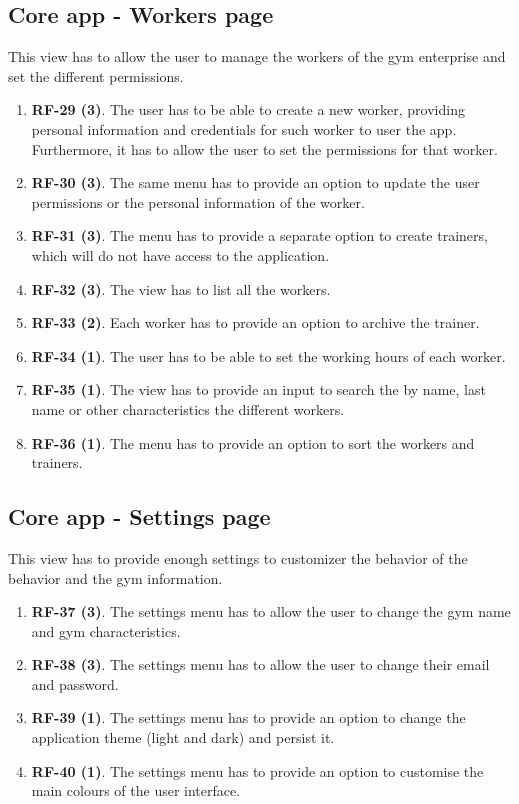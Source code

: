 \documentclass[a4paper, 12pt, oneside]{book}
\begin{document}
\subsection{Core app - Workers page}
This view has to allow the user to manage the workers of the gym enterprise and set the different permissions.
\begin{enumerate}[label = -]
	\item \textbf{RF-29 (3)}. The user has to be able to create a new worker, providing personal information and credentials for such worker to user the app. Furthermore, it has to allow the user to set the permissions for that worker.
	\item \textbf{RF-30 (3)}. The same menu has to provide an option to update the user permissions or the personal information of the worker.
	\item \textbf{RF-31 (3)}. The menu has to provide a separate option to create trainers, which will do not have access to the application.
	\item \textbf{RF-32 (3)}. The view has to list all the workers.
	\item \textbf{RF-33 (2)}. Each worker has to provide an option to archive the trainer.
	\item \textbf{RF-34 (1)}. The user has to be able to set the working hours of each worker.
	\item \textbf{RF-35 (1)}. The view has to provide an input to search the by name, last name or other characteristics the different workers.
	\item \textbf{RF-36 (1)}. The menu has to provide an option to sort the workers and trainers.
\end{enumerate}
\subsection{Core app - Settings page}
This view has to provide enough settings to customizer the behavior of the behavior and the gym information.
\begin{enumerate}[label = -]
	\item \textbf{RF-37 (3)}. The settings menu has to allow the user to change the gym name and gym characteristics.
	\item \textbf{RF-38 (3)}. The settings menu has to allow the user to change their email and password.
	\item \textbf{RF-39 (1)}. The settings menu has to provide an option to change the application theme (light and dark) and persist it.
	\item \textbf{RF-40 (1)}. The settings menu has to provide an option to customise the main colours of the user interface.
\end{enumerate}
\end{document}
